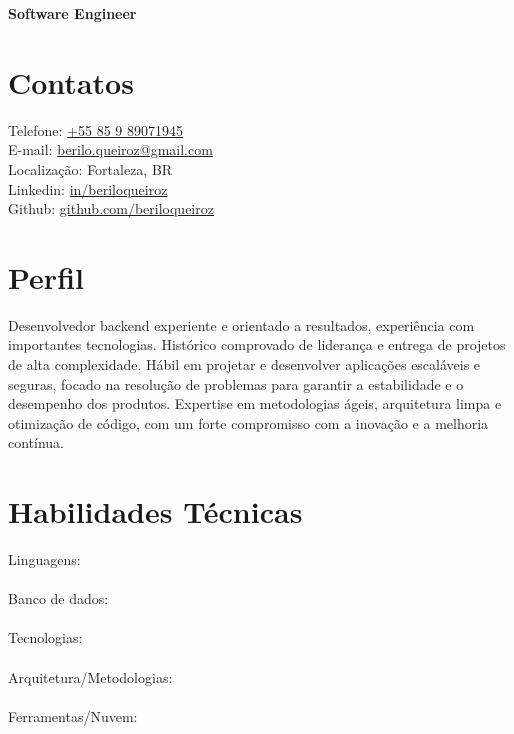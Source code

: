 \documentclass[11pt,a4paper,sans]{moderncv}
\begin{document}
\makecvtitle
\vspace*{-10mm}
\begin{center}\textbf{ Software Engineer}\end{center}

\section{Contatos}
 {
  \begin{samepage}
	  \faMobile\enspace Telefone: {\color{blue}\href{tel:+5585989071945}{+55 85 9 89071945}} \\
	  \faEnvelope\enspace E-mail: {\color{blue}\href{mailto:berilo.queiroz@gmail.com}{berilo.queiroz@gmail.com}} \\
	  \faHome\enspace Localização: Fortaleza, BR \\
	  \faLinkedin\enspace Linkedin: {\color{blue}\href{https://www.linkedin.com/in/beriloqueiroz}{in/beriloqueiroz}}\\
	  \faGithub\enspace Github: {\color{blue} \href{https://github.com/beriloqueiroz}{github.com/beriloqueiroz}}
  \end{samepage}
 }
\section{Perfil}
 {
  Desenvolvedor backend experiente e orientado a resultados, experiência com importantes tecnologias.
  Histórico comprovado de liderança e entrega de projetos de alta complexidade. Hábil
  em projetar e desenvolver aplicações escaláveis e seguras, focado na resolução de problemas para garantir
  a estabilidade e o desempenho dos produtos. Expertise em metodologias ágeis, arquitetura limpa e
  otimização de código, com um forte compromisso com a inovação e a melhoria contínua.
 }

\section{Habilidades Técnicas}
 {
  Linguagens:       
    \\
  \\
  Banco de dados:     \\
  \\
  Tecnologias:    \\
  \\
  Arquitetura/Metodologias:      \\
  \\
  Ferramentas/Nuvem:      \\
 }
\end{document}
